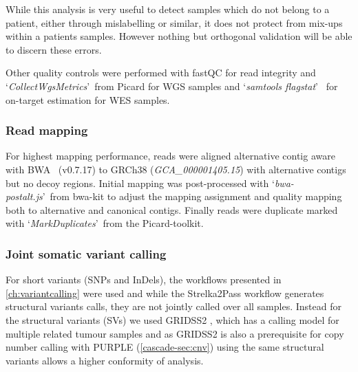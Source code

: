While this analysis is very useful to detect samples which do not belong to a patient, either through mislabelling or similar, it does not protect from mix-ups within a patients samples. However nothing but orthogonal validation will be able to discern these errors.

Other quality controls were performed with fastQC \cite{Andrews2010} for read integrity and \lq\emph{CollectWgsMetrics}\rq~from Picard \cite{Picard2018} for WGS samples and \lq\emph{samtools flagstat}\rq~\cite{Danecek2021} for on-target estimation for WES samples.

\subsubsection{Read mapping}
\label{cascade-sec:mapping}
For highest mapping performance, reads were aligned alternative contig aware with BWA~\cite{Li2013} (v0.7.17)  to GRCh38 (\emph{GCA\_000001405.15}) with alternative contigs but no decoy regions. Initial mapping was post-processed with \lq\emph{bwa-postalt.js}\rq~from bwa-kit to adjust the mapping assignment and quality mapping both to alternative and canonical contigs. Finally reads were duplicate marked with \lq\emph{MarkDuplicates}\rq~from the Picard-toolkit.

\subsubsection{Joint somatic variant calling}
\label{cascade-sec:jsvc}
For short variants (SNPs and InDels), the workflows presented in \autoref{ch:variantcalling} were used and while the Strelka2Pass workflow generates structural variants calls, they are not jointly called over all samples. Instead for the structural variants (SVs) we used GRIDSS2 \cite{Cameron2021}, which has a calling model for multiple related tumour samples and as GRIDSS2 is also a prerequisite for copy number calling with PURPLE (\autoref{cascade-sec:cnv}) using the same structural variants allows a higher conformity of analysis.


